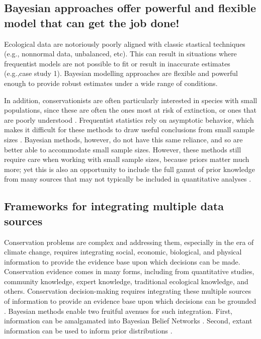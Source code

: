 \documentclass{article}
\begin{document}
\subsection*{Bayesian approaches offer powerful and flexible model that can get the job done!}
\par Ecological data are notoriously poorly aligned with classic stastical techniques (e.g., nonnormal data, unbalanced, etc). This can result in situations where frequentist models are not possible to fit or result in inaccurate estimates (e.g.,case study 1). Bayesian modelling approaches are flexible and powerful enough to provide robust estimates under a wide range of conditions. 
\par In addition, conservationists are often particularly interested in species with small populations, since these are often the ones most at risk of extinction, or ones that are poorly understood \citep{stinchcombe2002influence}. Frequentist statistics rely on asymptotic behavior, which makes it difficult for these methods to draw useful conclusions from small sample sizes \citep{mcneigh2016using}. Bayesian methods, however, do not have this same reliance, and so are better able to accommodate small sample sizes. However, these methods still require care when working with small sample sizes, because priors matter much more; yet this is also an opportunity to include the full gamut of prior knowledge from many sources that may not typically be included in quantitative analyses \citep{mcneish2016using}. 

\subsection*{Frameworks for integrating multiple data sources}
\par Conservation problems are complex and addressing them, especially in the era of climate change, requires integrating social, economic, biological, and physical information to provide the evidence base upon which decisions can be made. Conservation evidence comes in many forms, including from quantitative studies, community knowledge, expert knowledge, traditional ecological knowledge, and others. Conservation decision-making requires integrating these multiple sources of information to provide an evidence base upon which decisions can be grounded \citep{stern2022interweaving}. Bayesian methods enable two fruitful avenues for such integration. First, information can be amalgamated into Bayesian Belief Networks \citep{marcot2001using,newton2007bayesian}. Second, extant information can be used to inform prior distributions \citep{o2008informed}. 
\end{document}
